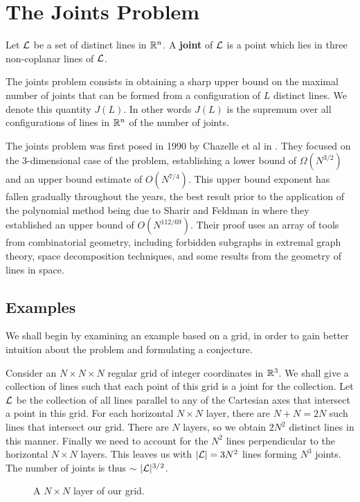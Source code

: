 \chapter{The Joints Problem \label{chap:joints}}
\begin{definition}
    Let $\mathcal L$ be a set of distinct lines in $\mathbb R^n$. A \textbf{joint} of $\mathcal L$ is a point which lies in three non-coplanar lines of $\mathcal L$.
\end{definition}
The joints problem consists in obtaining a sharp upper bound on the maximal number of joints that can be formed from a configuration of $L$ distinct lines.
We denote this quantity $J(L)$. In other words $J(L)$ is the supremum over all configurations of lines in $\mathbb R^n$ of the number of joints.

The joints problem was first posed in 1990 by Chazelle et al in \cite{chazelle1990counting}. They focused on the 3-dimensional case of the problem, establishing a lower bound of $\Omega (N^{3/2})$ and an upper bound estimate of $O(N^{7/4})$. 
This upper bound exponent has fallen gradually throughout the years, the best result prior to the application of the polynomial method being due to Sharir and Feldman in \cite{feldman2005improved} where they established an upper bound of $O(N^{112/69})$. Their
proof uses an array of tools from combinatorial geometry, including forbidden subgraphs in extremal graph theory, space decomposition techniques, and some results from the geometry of lines in space.

\section{Examples}
We shall begin by examining an example based on a grid, in order to gain better intuition about the problem and formulating a conjecture. 
\begin{example}Consider an $N \times N \times N$ regular grid of integer coordinates in $\mathbb R^3$. We shall give a collection of lines such that each point of this grid is a joint for the collection.
Let $\mathcal L$ be the collection of all lines parallel to any of the Cartesian axes that intersect a point in this grid.
For each horizontal $N \times N$ layer, there are $N+N = 2N$ such lines that intersect our grid. 
There are $N$ layers, so we obtain $2N^2$ distinct lines in this manner. Finally we need to account for the $N^2$ lines perpendicular to the horizontal $N\times N$ layers.
This leaves us with $|\mathcal L| = 3 N^2$ lines forming $N^3$ joints. The number of joints is thus $\sim$ $|\mathcal L|^{3/2}$. 
\end{example}
\begin{figure}[h]
    \centering
{}
\caption{A $N \times N$ layer of our grid.}
\end{figure}

